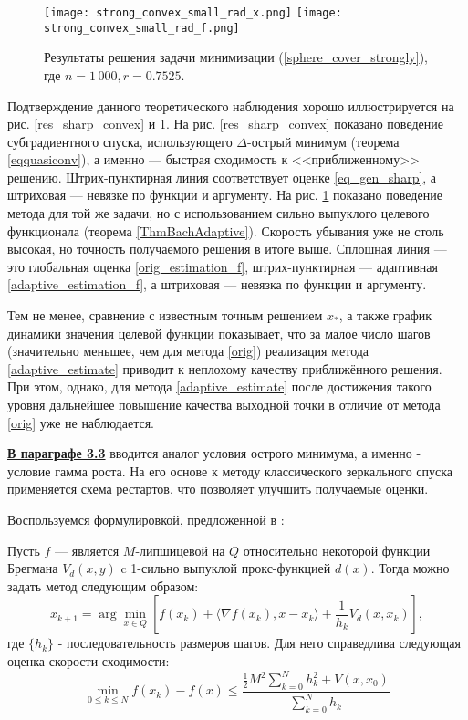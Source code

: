 \begin{figure}[h]
    \texttt{[image: strong\_convex\_small\_rad\_x.png]}
    \endminipage\hfill
    \texttt{[image: strong\_convex\_small\_rad\_f.png]}
    \endminipage\hfill
    \caption{ Результаты решения задачи минимизации (\ref{sphere_cover_strongly}), где  $n= 1\,000, r = 0.7525$.}
    \label{res_strong_convex}
\end{figure}

Подтверждение данного теоретического наблюдения хорошо иллюстрируется на рис. \ref{res_sharp_convex} и \ref{res_strong_convex}. На рис. \ref{res_sharp_convex} показано поведение субградиентного спуска, использующего $\Delta$-острый минимум (теорема \ref{eqquasiconv}), а именно --- быстрая сходимость к <<приближенному>> решению. Штрих-пунктирная линия соответствует оценке \eqref{eq_gen_sharp}, а штриховая --- невязке по функции и аргументу. На рис. \ref{res_strong_convex} показано поведение метода для той же задачи, но с использованием сильно выпуклого целевого функционала (теорема \ref{ThmBachAdaptive}). Скорость убывания уже не столь высокая, но точность получаемого решения в итоге выше. Сплошная линия --- это глобальная оценка \eqref{orig_estimation_f}, штрих-пунктирная --- адаптивная \eqref{adaptive_estimation_f}, а штриховая --- невязка по функции и аргументу.

Тем не менее, сравнение с известным точным решением $x_*$, а также график динамики значения целевой функции показывает, что за малое число шагов (значительно меньшее, чем для метода \eqref{orig}) реализация метода \eqref{adaptive_estimate} приводит к неплохому качеству приближённого решения. При этом, однако, для метода \eqref{adaptive_estimate} после достижения такого уровня дальнейшее повышение качества выходной точки в отличие от метода \eqref{orig} уже не наблюдается.

\underline{\textbf{В параграфе 3.3}} вводится аналог условия острого минимума, а именно - условие гамма роста. На его основе к методу классического зеркального спуска применяется схема рестартов, что позволяет улучшить получаемые оценки.

Воспользуемся формулировкой, предложенной в \cite{Lu_2018}:
\begin{theorem} \label{vanilla_mirror}
    Пусть $f$ --- является $M$-липшицевой на $Q$ относительно некоторой функции Брегмана $V_d(x, y)$ c 1-сильно выпуклой прокс-функцией $d(x)$. Тогда можно задать метод следующим образом:
    \begin{equation} \label{mirr_upd}
        x_{k+1} = \arg \min_{x \in Q} {\left[ f(x_k) + \langle \nabla f(x_k), x - x_k \rangle + \frac{1}{h_k} V_d(x, x_k)\right]},
    \end{equation}
    где $\{ h_k \}$ - последовательность размеров шагов.
    Для него справедлива следующая оценка скорости сходимости:
    \begin{equation} \label{general_est}
        \min_{0\leq k \leq N} f(x_k) - f(x) \leq \frac{\frac{1}{2} M^2 \sum_{k=0}^N h_k^2 + V(x, x_0)}{\sum_{k=0}^N h_k}
    \end{equation}
\end{theorem}


